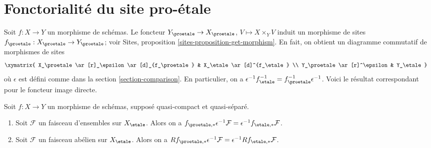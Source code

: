 \section{Fonctorialité du site pro-\'etale}
\label{section-morphism}

\noindent
Soit $f : X \to Y$ un morphisme de schémas. Le foncteur
$Y_\proetale \to X_\proetale$, $V \mapsto X \times_Y V$
induit un morphisme de sites $f_\proetale : X_\proetale \to Y_\proetale$; voir
Sites, proposition \ref{sites-proposition-get-morphism}.
En fait, on obtient un diagramme commutatif de morphismes de sites
$$
\xymatrix{
X_\proetale \ar[r]_\epsilon \ar[d]_{f_\proetale} &
X_\etale \ar[d]^{f_\etale} \\
Y_\proetale \ar[r]^\epsilon & Y_\etale
}
$$
où $\epsilon$ est défini comme dans la section \ref{section-comparison}.
En particulier, on a
$\epsilon^{-1} f_\etale^{-1} = f_\proetale^{-1} \epsilon^{-1}$.
Voici le résultat correspondant pour le foncteur image directe.

\begin{lemma}
\label{lemma-morphism-comparison}
Soit $f : X \to Y$ un morphisme de schémas, supposé quasi-compact et
quasi-séparé.
\begin{enumerate}
\item Soit $\mathcal{F}$ un faisceau d'ensembles sur $X_\etale$. Alors on a
$f_{\proetale, *}\epsilon^{-1}\mathcal{F} =
\epsilon^{-1}f_{\etale, *}\mathcal{F}$.
\item Soit $\mathcal{F}$ un faisceau abélien sur $X_\etale$. Alors on a
$Rf_{\proetale, *}\epsilon^{-1}\mathcal{F} =
\epsilon^{-1}Rf_{\etale, *}\mathcal{F}$.
\end{enumerate}
\end{lemma}

